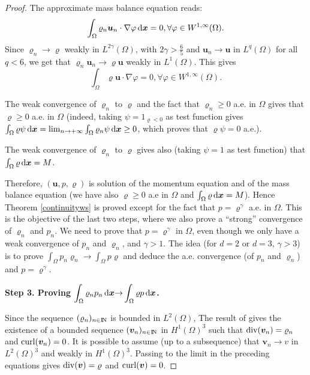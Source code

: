 \documentclass{amsart}
\numberwithin{equation}{section}
\begin{document}
\begin{proof}
\medskip
The approximate mass balance equation reads: 
\[
\int_\Omega {\varrho}_n {{\boldsymbol u}}_n \cdot {{\nabla}} \varphi {\, {\rm d}{{\boldsymbol x}}} = 0, \forall \varphi \in W^{1,\infty}(\Omega).
\]
Since ${\varrho}_n {\rightarrow} {\varrho}$ weakly in $L^{2 \gamma}(\Omega)$, with $2 \gamma > \frac 6 5 $
and ${{\boldsymbol u}}_n {\rightarrow} {{\boldsymbol u}}$ in $L^q(\Omega)$ for all $q <6$, we get that ${\varrho}_n {{\boldsymbol u}}_n {\rightarrow} {\varrho} {{\boldsymbol u}}$ weakly in $L^1(\Omega)$. This gives 
\begin{equation*}
\int_\Omega {\varrho} {{\boldsymbol u}} \cdot {{\nabla}} \varphi = 0, \forall \varphi \in W^{1,\infty}(\Omega).
\end{equation*}

\medskip
The weak convergence of ${\varrho}_n$ to ${\varrho}$ and the fact that ${\varrho}_n \ge 0$ a.e.  in $\Omega$ gives that
${\varrho} \ge 0$ a.e.  in $\Omega$ (indeed, taking $\psi = 1_{{\varrho} <0}$ as test function  gives $\int_{\Omega} {\varrho} \psi{\, {\rm d}{{\boldsymbol x}}}
=\lim_{{n {\rightarrow} + \infty}} \int_{\Omega} {\varrho}_n \psi{\, {\rm d}{{\boldsymbol x}}} \ge 0$, which proves that ${\varrho} \psi=0$ a.e.).

\medskip
The weak convergence of ${\varrho}_n$ to ${\varrho}$ gives also (taking $\psi=1$ as test function) that $\int_{\Omega} {\varrho}{\, {\rm d}{{\boldsymbol x}}} =M$. 

\medskip
Therefore, $({\bm{u}},p,{\varrho})$ is solution of the momentum equation and of the mass balance equation (we have also $ {\varrho} \ge 0$ a.e in $\Omega$ and $ \int_\Omega {\varrho} {\, {\rm d}{{\boldsymbol x}}} =M$).
Hence Theorem \ref{continuityws} is proved except for the fact that $p= {\varrho}^\gamma$ a.e.  in $\Omega$. This is the objective of the last two steps, where we also prove a ``strong'' convergence of ${\varrho}_n$ and $p_n$.
We need to prove that $p={\varrho}^\gamma \textrm{ in } \Omega$, even though we only have a weak convergence of $p_n$ and ${\varrho}_n$, and $\gamma >1$.
The idea (for $d=2$ or $d=3$, $\gamma > 3$) is to prove $\int_\Omega  p_n {\varrho}_n  {\rightarrow} \int_\Omega p {\varrho} $ and deduce the a.e. convergence (of $ p_n$ and $ {\varrho}_n$) and $p={\varrho}^\gamma$.

\bigskip
{\bf Step 3. Proving $\displaystyle \int_{\Omega}  {\varrho}_n p_n{\, {\rm d}{{\boldsymbol x}}}  {\rightarrow} \int_{\Omega} {\varrho} p{\, {\rm d}{{\boldsymbol x}}}$.}

\medskip
Since the sequence $({\varrho}_n)_{{n \in {\ifmmode{\rm	I\mkern-3.1mu
N\mkern0.5mu}\else{\rm I\kern-.16em
N\hskip0.5pt\ }\fi\relax}}}$ is bounded in $L^2(\Omega)$,
The result of \cite[Lemma B.8]{eymard2010convergent} gives the existence of a bounded sequence $({\bm{v}}_n)_{{n \in {\ifmmode{\rm	I\mkern-3.1mu
N\mkern0.5mu}\else{\rm I\kern-.16em
N\hskip0.5pt\ }\fi\relax}}}$ in $H^1(\Omega)^3$ such that ${{\rm div}}({\bm{v}}_n)={\varrho}_n$ and ${{\rm curl}}({\bm{v}}_n)=0$.
It is possible to assume (up to a subsequence) that ${\bm{v}}_n {\rightarrow} v$ in $L^2(\Omega)^3$ and weakly in $H^1(\Omega)^3$.
Passing to the limit in the preceding equations gives ${{\rm div}}({\bm{v}})={\varrho}$ and ${{\rm curl}}({\bm{v}})=0$.


\end{proof}
\end{document}
